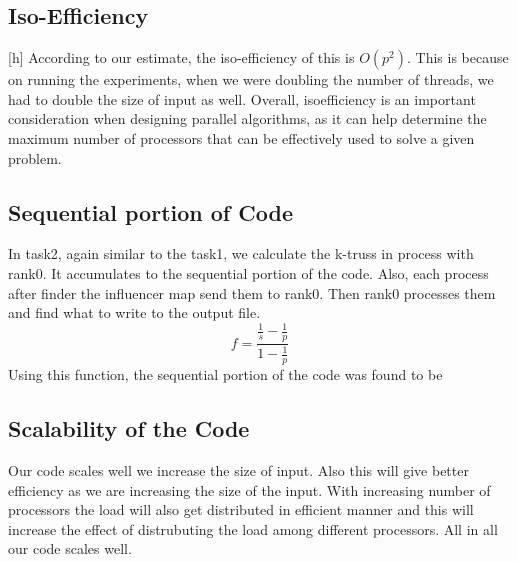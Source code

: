 \documentclass[12pt,a4paper]{article}
\begin{document}
\newpage
\subsection{Iso-Efficiency}[h]
According to our estimate, the iso-efficiency of this is $O(p^{2})$. This is because on running the experiments, when we were doubling the number of threads, we had to double the size of input as well. Overall, isoefficiency is an important consideration when designing parallel algorithms, as it can help determine the maximum number of processors that can be effectively used to solve a given problem.

\subsection{Sequential portion of Code}
In task2, again similar to the task1, we calculate the k-truss in process with rank0. It accumulates to the sequential portion of the code. Also, each process after finder the influencer map send them to rank0. Then rank0 processes them and find what to write to the output file.
$$f = \frac{\frac{1}{s} - \frac{1}{p}}{1 - \frac{1}{p}}$$ 
Using this function, the sequential portion of the code was found to be 

\subsection{Scalability of the Code}
Our code scales well we increase the size of input. Also this will give better efficiency as we are increasing the size of the input. With increasing number of processors the load will also get distributed in efficient manner and this will increase the effect of distrubuting the load among different processors. All in all our code scales well.
\end{document}
